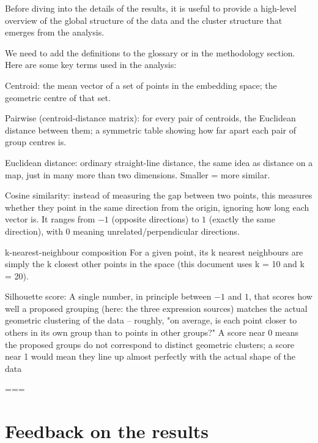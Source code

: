Before diving into the details of the results, it is useful to provide a high-level overview of the global structure of the data and the cluster structure that emerges from the analysis.






We need to add the definitions to the glossary or in the methodology section. Here are some key terms used in the analysis:

Centroid: the mean vector of a set of points in the embedding space; the geometric centre of that set.

Pairwise (centroid-distance matrix): for every pair of centroids, the Euclidean distance between them; a symmetric table showing how far apart each pair of group centres is.

Euclidean distance: ordinary straight-line distance, the same idea as distance on a map,
just in many more than two dimensions. Smaller = more similar.

Cosine similarity: instead of measuring the gap between two points, this measures whether they point in the same direction from the origin, ignoring how long each vector is. It ranges from $-1$ (opposite directions) to $1$ (exactly the same direction), with 0 meaning unrelated/perpendicular directions.

k-nearest-neighbour composition
For a given point, its k nearest neighbours are simply the k closest other points in the
space (this document uses k = 10 and k = 20).

Silhouette score: A single number, in principle between $-1$ and $1$, that scores how well a proposed grouping
(here: the three expression sources) matches the actual geometric clustering of the data – roughly, "on average, is each point closer to others in its own group than to points in other groups?" A score near 0 means the proposed groups do not correspond to distinct geometric clusters; a score near 1 would mean they line up almost perfectly with the actual shape of the data






===

\section{Feedback on the results}
